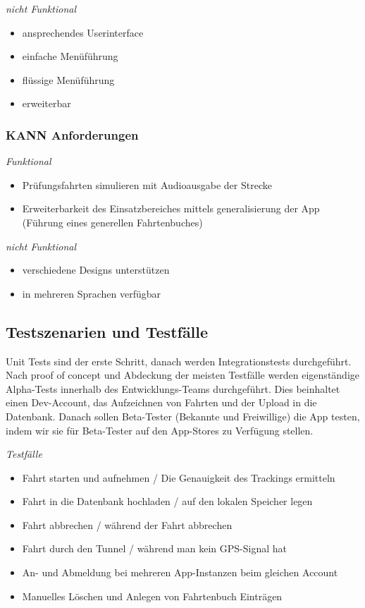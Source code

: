 	\emph{nicht Funktional}
		\begin{itemize}
			\item ansprechendes Userinterface
			\item einfache Menüführung
			\item flüssige Menüführung
			\item erweiterbar
		\end{itemize}
	
	\subsubsection{KANN Anforderungen}
	\emph{Funktional}
		\begin{itemize}
			\item Prüfungsfahrten simulieren mit Audioausgabe der Strecke
			\item Erweiterbarkeit des Einsatzbereiches mittels generalisierung der App (Führung eines generellen Fahrtenbuches)
		\end{itemize}

	\emph{nicht Funktional}
	\begin{itemize}
		\item verschiedene Designs unterstützen 
		\item in mehreren Sprachen verfügbar
	\end{itemize}

\subsection{Testszenarien und Testfälle}

Unit Tests sind der erste Schritt, danach werden Integrationstests durchgeführt. Nach proof of concept und Abdeckung der meisten Testfälle werden eigenständige Alpha-Tests innerhalb des Entwicklungs-Teams durchgeführt. Dies beinhaltet einen Dev-Account, das Aufzeichnen von Fahrten und der Upload in die Datenbank. Danach sollen Beta-Tester (Bekannte und Freiwillige) die App testen, indem wir sie für Beta-Tester auf den App-Stores zu Verfügung stellen.

\emph{Testfälle}
\begin{itemize}
	\item Fahrt starten und aufnehmen / Die Genauigkeit des Trackings ermitteln
	\item Fahrt in die Datenbank hochladen / auf den lokalen Speicher legen
	\item Fahrt abbrechen / während der Fahrt abbrechen
	\item Fahrt durch den Tunnel / während man kein GPS-Signal hat
	\item An- und Abmeldung bei mehreren App-Instanzen beim gleichen Account
	\item Manuelles Löschen und Anlegen von Fahrtenbuch Einträgen
\end{itemize}
